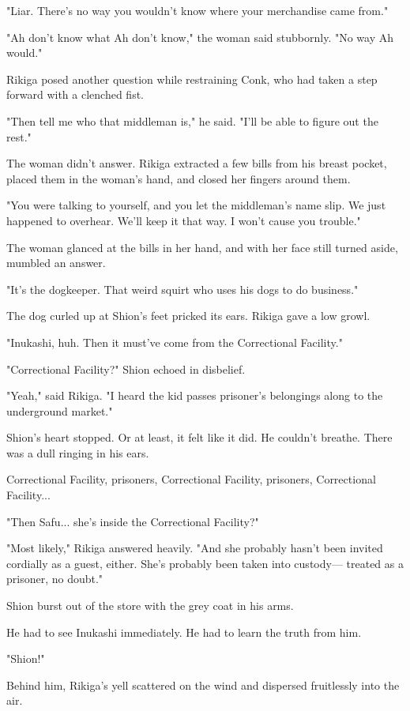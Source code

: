 "Liar. There's no way you wouldn't know where your merchandise came
from."

"Ah don't know what Ah don't know," the woman said stubbornly. "No way
Ah would."

Rikiga posed another question while restraining Conk, who had taken a
step forward with a clenched fist.

"Then tell me who that middleman is," he said. "I'll be able to figure
out the rest."

The woman didn't answer. Rikiga extracted a few bills from his breast
pocket, placed them in the woman's hand, and closed her fingers around
them.

"You were talking to yourself, and you let the middleman's name slip. We
just happened to overhear. We'll keep it that way. I won't cause you
trouble."

The woman glanced at the bills in her hand, and with her face still
turned aside, mumbled an answer.

"It's the dogkeeper. That weird squirt who uses his dogs to do
business."

The dog curled up at Shion's feet pricked its ears. Rikiga gave a low
growl.

"Inukashi, huh. Then it must've come from the Correctional Facility."

"Correctional Facility?" Shion echoed in disbelief.

"Yeah," said Rikiga. "I heard the kid passes prisoner's belongings along
to the underground market."

Shion's heart stopped. Or at least, it felt like it did. He couldn't
breathe. There was a dull ringing in his ears.

Correctional Facility, prisoners, Correctional Facility, prisoners,
Correctional Facility...

"Then Safu... she's inside the Correctional Facility?"

"Most likely," Rikiga answered heavily. "And she probably hasn't been
invited cordially as a guest, either. She's probably been taken into
custody--- treated as a prisoner, no doubt."

Shion burst out of the store with the grey coat in his arms.

He had to see Inukashi immediately. He had to learn the truth from him.

"Shion!"

Behind him, Rikiga's yell scattered on the wind and dispersed
fruitlessly into the air.

